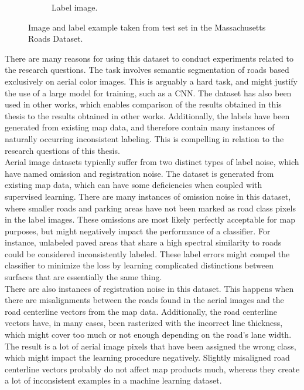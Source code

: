 \begin{figure}
\begin{subfigure}{0.48\textwidth}
\caption{Label image.} \label{fig:mass_roads_example_label}
\end{subfigure}
\hspace*{\fill} %
\caption[The Massachusetts Roads Dataset]{Image and label example taken from test set in the Massachusetts Roads Dataset.} \label{fig:mass_roads_example}
\end{figure}


There are many reasons for using this dataset to conduct experiments related to the research questions.  The task involves semantic segmentation of roads based exclusively on aerial color images. This is arguably a hard task, and might justify the use of a large model for training, such as a \ac{CNN}. The dataset has also been used in other works, which enables comparison of the results obtained in this thesis to the results obtained in other works. Additionally, the labels have been generated from existing map data, and therefore contain many instances of naturally occurring inconsistent labeling. This is compelling in relation to the research questions of this thesis.\\

Aerial image datasets typically suffer from two distinct types of label noise, which \cite{Mnih_aerial_images_noisy} have named omission and registration noise. The dataset is generated from existing map data, which can have some deficiencies when coupled with supervised learning. There are many instances of omission noise in this dataset, where smaller roads and parking areas have not been marked as road class pixels in the label images. These omissions are most likely perfectly acceptable for map purposes, but might negatively impact the performance of a classifier.  For instance, unlabeled paved areas that share a high spectral similarity to roads could be considered inconsistently labeled. These label errors might compel the classifier to minimize the loss by learning complicated distinctions between surfaces that are essentially the same thing.\\

There are also instances of registration noise in this dataset. This happens when there are misalignments between the roads found in the aerial images and the road centerline vectors from the map data. Additionally, the road centerline vectors have, in many cases, been rasterized with the incorrect line thickness, which might cover too much or not enough depending on the road's lane width. The result is a lot of aerial image pixels that have been assigned the wrong class, which might impact the learning procedure negatively. Slightly misaligned road centerline vectors probably do not affect map products much, whereas they create a lot of inconsistent examples in a machine learning dataset.


